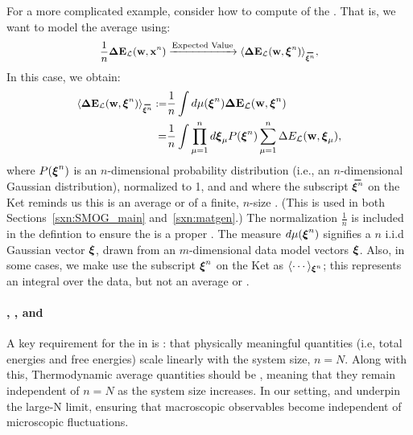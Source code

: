 For a more complicated example, consider how to compute \ExpectedValue of the \DataSampleError.
That is, we want to model the average \DataSampleError using:
\begin{align}
  \label{eqn:Emap}
  \frac{1}{n}\DETOPX \xrightarrow{\text{Expected Value}} \langle \DETOPXI \rangle_{\AVGNDXIn}  , %
\end{align}
In this case, we obtain:
\begin{align}
\nonumber
  \langle \DETOPXI\rangle_{\AVGNDXIn}
  :=  &\frac{1}{n}\int d\mu(\NDXIn) \DETOPXI \\ 
  \label{eqn:average_data_sample_error}
  = &
  \frac{1}{n}\int \prod_{\mu=1}^{n}d\XI_{\mu}P(\NDXIn) \sum_{\mu=1}^{n}\DETmu  ,
\end{align}
where $P(\boldsymbol{\xi}^{n})$ is an $n$-dimensional
probability distribution (i.e., an $n$-dimensional Gaussian distribution), normalized to 1, and
and where the subscript $\AVGNDXIn$ on the Ket reminds us this is an average or \ExpectedValue of a finite, $n$-size \ModelSample.
(This is used in both Sections~\ref{sxn:SMOG_main} and~\ref{sxn:matgen}.)
The normalization $\tfrac{1}{n}$ is included in the defintion to ensure the \BraKet is a proper \ExpectedValue.
The measure $d\mu(\boldsymbol{\xi}^{n})$ signifies a $n$ i.i.d Gaussian vector $\boldsymbol{\xi}$, drawn from an $m$-dimensional data model vectors $\boldsymbol{\xi}$.
Also, in some cases, we make use the subscript $\boldsymbol{\xi}^{n}$ on the Ket as $\langle\cdots\rangle_{\boldsymbol{\xi}^{n}}$;  this represents an integral over the data, but not an average or \ExpectedValue.
%

\paragraph{\SizeExtensivity, \SizeIntensivity, and \SizeConsistency}
A key requirement for the \ThermodynamicLimit in \STATMECH is \emph{\SizeExtensivity}:
that physically meaningful quantities (i.e, total energies and free energies)
scale linearly with the system size, $n=N$.
Along with this, Thermodynamic average quantities should be \emph{\SizeIntensive},
meaning that they remain independent of $n=N$ as the system size increases.
In our setting, \SizeExtensivity and \SizeIntensivity underpin the large-N limit,
ensuring that macroscopic observables become independent of
microscopic fluctuations.

